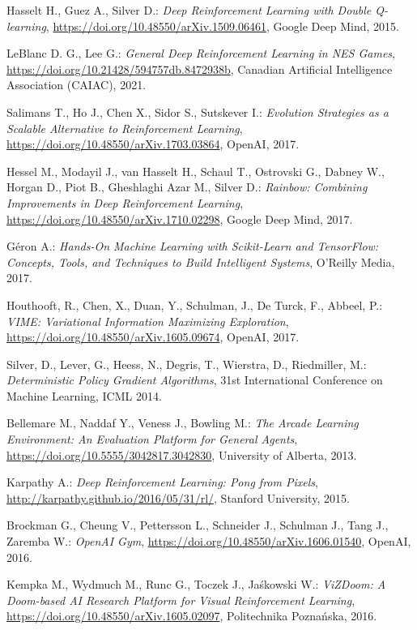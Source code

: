 \begin{thebibliography}{99}
	Hasselt H., Guez A., Silver D.:
	\emph{Deep Reinforcement Learning with Double Q-learning},
	\url{https://doi.org/10.48550/arXiv.1509.06461},
	Google Deep Mind, 2015.

	LeBlanc D. G., Lee G.:
	\emph{General Deep Reinforcement Learning in NES Games},
	\url{https://doi.org/10.21428/594757db.8472938b},
	Canadian Artificial Intelligence Association (CAIAC), 2021.

	Salimans T., Ho J., Chen X., Sidor S., Sutskever I.:
	\emph{Evolution Strategies as a Scalable Alternative to Reinforcement Learning},
	\url{https://doi.org/10.48550/arXiv.1703.03864}, OpenAI, 2017.

	Hessel M., Modayil J., van Hasselt H., Schaul T., Ostrovski G., Dabney W., Horgan D., Piot B., Gheshlaghi Azar M., Silver D.:
	\emph{Rainbow: Combining Improvements in Deep Reinforcement Learning},
	\url{https://doi.org/10.48550/arXiv.1710.02298},
	Google Deep Mind, 2017.

	Géron A.:
	\emph{Hands-On Machine Learning with Scikit-Learn and TensorFlow: Concepts, Tools, and Techniques to Build Intelligent Systems},
	O'Reilly Media, 2017.

	 Houthooft, R., Chen, X., Duan, Y., Schulman, J., De Turck, F., Abbeel, P.: \emph{VIME: Variational Information Maximizing Exploration},  \url{https://doi.org/10.48550/arXiv.1605.09674}, OpenAI, 2017.

	 Silver, D., Lever, G., Heess, N., Degris, T., Wierstra, D., Riedmiller, M.: \emph{Deterministic Policy Gradient Algorithms}, 31st International Conference on Machine Learning, ICML 2014.

	Bellemare M., Naddaf Y., Veness J., Bowling M.:
	\emph{The Arcade Learning Environment: An Evaluation Platform for General Agents},
	\url{https://doi.org/10.5555/3042817.3042830},
	University of Alberta, 2013.

	Karpathy A.:
	\emph{Deep Reinforcement Learning: Pong from Pixels},
	\url{http://karpathy.github.io/2016/05/31/rl/},
	Stanford University, 2015.

	Brockman G., Cheung V., Pettersson L., Schneider J., Schulman J., Tang J., Zaremba W.:
	\emph{OpenAI Gym},
	\url{https://doi.org/10.48550/arXiv.1606.01540},
	OpenAI, 2016.

	Kempka M., Wydmuch M., Runc G., Toczek J., Jaśkowski W.:
	\emph{ViZDoom: A Doom-based AI Research Platform for Visual Reinforcement Learning},
	\url{https://doi.org/10.48550/arXiv.1605.02097},
	Politechnika Poznańska, 2016.


\end{thebibliography}
